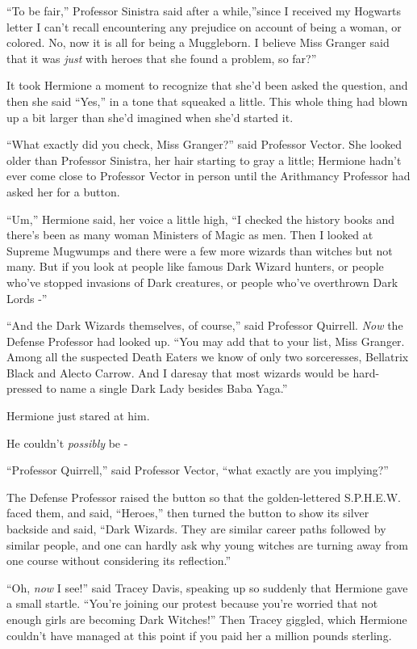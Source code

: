 ``To be fair,'' Professor Sinistra said after a while,''since I received
my Hogwarts letter I can't recall encountering any prejudice on account
of being a woman, or colored. No, now it is all for being a Muggleborn.
I believe Miss Granger said that it was \emph{just} with heroes that she
found a problem, so far?''

It took Hermione a moment to recognize that she'd been asked the
question, and then she said ``Yes,'' in a tone that squeaked a little.
This whole thing had blown up a bit larger than she'd imagined when
she'd started it.

``What exactly did you check, Miss Granger?'' said Professor Vector. She
looked older than Professor Sinistra, her hair starting to gray a
little; Hermione hadn't ever come close to Professor Vector in person
until the Arithmancy Professor had asked her for a button.

``Um,'' Hermione said, her voice a little high, ``I checked the history
books and there's been as many woman Ministers of Magic as men. Then I
looked at Supreme Mugwumps and there were a few more wizards than
witches but not many. But if you look at people like famous Dark Wizard
hunters, or people who've stopped invasions of Dark creatures, or people
who've overthrown Dark Lords -''

``And the Dark Wizards themselves, of course,'' said Professor Quirrell.
\emph{Now} the Defense Professor had looked up. ``You may add that to
your list, Miss Granger. Among all the suspected Death Eaters we know of
only two sorceresses, Bellatrix Black and Alecto Carrow. And I daresay
that most wizards would be hard-pressed to name a single Dark Lady
besides Baba Yaga.''

Hermione just stared at him.

He couldn't \emph{possibly} be -

``Professor Quirrell,'' said Professor Vector, ``what exactly are you
implying?''

The Defense Professor raised the button so that the golden-lettered
S.P.H.E.W. faced them, and said, ``Heroes,'' then turned the button to
show its silver backside and said, ``Dark Wizards. They are similar
career paths followed by similar people, and one can hardly ask why
young witches are turning away from one course without considering its
reflection.''

``Oh, \emph{now} I see!'' said Tracey Davis, speaking up so suddenly that
Hermione gave a small startle. ``You're joining our protest because
you're worried that not enough girls are becoming Dark Witches!'' Then
Tracey giggled, which Hermione couldn't have managed at this point if
you paid her a million pounds sterling.

